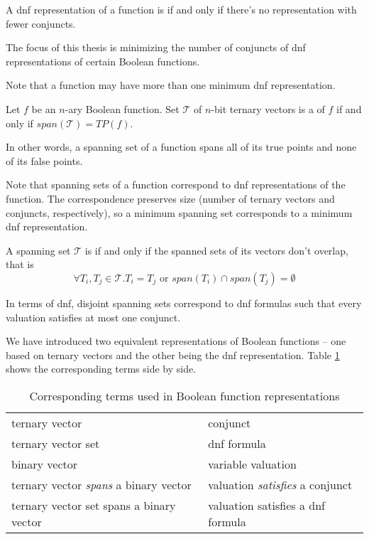 \begin{definition}
A \acrshort{dnf} representation of a function is
if and only if
there's no representation with fewer conjuncts.
\end{definition}

The focus of this thesis is
minimizing the number of conjuncts
of \acrshort{dnf} representations
of certain Boolean functions.

Note that a function may have more than one minimum
\acrshort{dnf} representation.

\begin{definition}
Let $f$ be an $n$-ary Boolean function.
Set $\mathcal{T}$ of $n$-bit ternary vectors
is a  of $f$
if and only if
$span(\mathcal{T}) = TP(f)$.
\end{definition}

In other words,
a spanning set of a function
spans all of its true points
and none of its false points.

Note that spanning sets of a function
correspond to \acrshort{dnf} representations
of the function.
The correspondence preserves size
(number of ternary vectors and conjuncts, respectively),
so a minimum spanning set
corresponds to a minimum \acrshort{dnf} representation.

\begin{definition}
A spanning set $\mathcal{T}$ is 
if and only if the spanned sets of its vectors
don't overlap,
that is
\[
\forall T_i, T_j \in \mathcal{T} . T_i = T_j \text{ or }
span(T_i) \cap span(T_j) = \emptyset
\]
\end{definition}

In terms of \acrshort{dnf},
disjoint spanning sets
correspond to \acrshort{dnf} formulas
such that every valuation satisfies at most one conjunct.

We have introduced two equivalent representations
of Boolean functions --
one based on ternary vectors
and the other being the \acrshort{dnf} representation.
Table \ref{table:representations}
shows the corresponding terms side by side.

\begin{table}[h]
\label{table:representations}
\centering
\begin{tabular}{ll}
ternary vector & conjunct \\
ternary vector set & \acrshort{dnf} formula \\
binary vector & variable valuation \\
ternary vector \emph{spans} a binary vector &
valuation \emph{satisfies} a conjunct \\
ternary vector set spans a binary vector &
valuation satisfies a \acrshort{dnf} formula
\end{tabular}
\caption{
Corresponding terms used
in Boolean function representations
}
\end{table}

